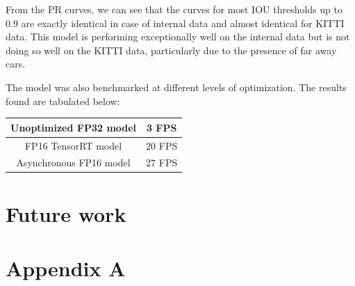 \documentclass[12pt,letterpaper]{article}
\begin{document}
From the PR curves, we can see that the curves for most IOU thresholds up to 0.9 are exactly identical in case of internal data and almost identical for KITTI data. This model is performing exceptionally well on the internal data but is not doing so well on the KITTI data, particularly due to the presence of far away cars. 

The model was also benchmarked at different levels of optimization. The results found are tabulated below:

\begin{center}
\begin{tabular}{|c|c|}
    \hline
    Unoptimized FP32 model & 3 FPS \\
    \hline
    FP16 TensorRT model & 20 FPS \\
    \hline
    Asynchronous FP16 model & 27 FPS \\
    \hline
\end{tabular}
\end{center}


\section{Future work}




\pagebreak



\section*{Appendix A}
\label{sec:appa}
\end{document}

